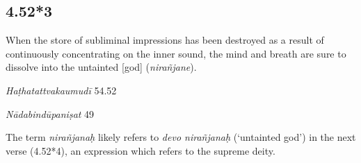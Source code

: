 \begin{ekdosis}

\subsection*{4.52*3}
\begin{translation}[hp04_052_3]
When the store of subliminal impressions has been destroyed as a result of continuously concentrating on the inner sound, the mind and breath are sure to dissolve into the untainted [god] (\emph{nirañjane}).
\end{translation}%
%


\begin{testimonia}[hp04_052_3]

\emph{Haṭhatattvakaumudī} 54.52
\begin{versinnote}
\end{versinnote}

\emph{Nādabindūpaniṣat} 49
\begin{versinnote}
\end{versinnote}
\end{testimonia}

\begin{philcomm}[hp04_052_3]
The term \emph{nirañjanaḥ} likely refers to \emph{devo nirañjanaḥ} (`untainted god') in the next verse (4.52*4), an expression which refers to the supreme deity.
\end{philcomm}


\end{ekdosis}
